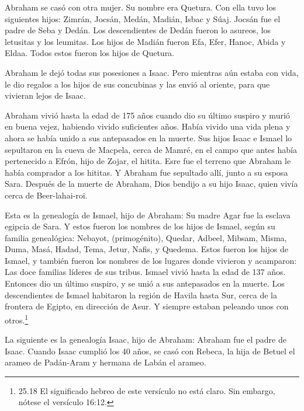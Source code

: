  Abraham se casó con otra mujer. Su nombre era Quetura.
 Con ella tuvo los siguientes hijos: Zimrán, Jocsán, Medán,
Madián, Isbac y Súaj.  Jocsán fue el padre de Seba y Dedán.
Los descendientes de Dedán fueron lo asureos, los letusitas y los
leumitas.  Los hijos de Madián fueron Efa, Efer, Hanoc,
Abida y Eldaa. Todos estos fueron los hijos de Quetura.

 Abraham le dejó todas sus posesiones a Isaac. 
Pero mientras aún estaba con vida, le dio regalos a los hijos de sus
concubinas y las envió al oriente, para que vivieran lejos de Isaac.

 Abraham vivió hasta la edad de 175 años  cuando
dio su último suspiro y murió en buena vejez, habiendo vivido
suficientes años. Había vivido una vida plena y ahora se había unido a
sus antepasados en la muerte.  Sus hijos Isaac e Ismael lo
sepultaron en la cueva de Macpela, cerca de Mamré, en el campo que antes
había pertenecido a Efrón, hijo de Zojar, el hitita.  Esre
fue el terreno que Abraham le había comprador a los hititas. Y Abraham
fue sepultado allí, junto a su esposa Sara.  Después de la
muerte de Abraham, Dios bendijo a su hijo Isaac, quien vivía cerca de
Beer-lahai-roi.

 Esta es la genealogía de Ismael, hijo de Abraham: Su madre
Agar fue la esclava egipcia de Sara.  Y estos fueron los
nombres de los hijos de Ismael, según su familia genealógica: Nebayot,
(primogénito), Quedar, Adbeel, Mibsam,  Misma, Duma, Masá,
 Hadad, Tema, Jetur, Nafis, y Quedema.  Estos
fueron los hijos de Ismael, y también fueron los nombres de los lugares
donde vivieron y acamparon: Las doce familias líderes de sus tribus.
 Ismael vivió hasta la edad de 137 años. Entonces dio un
último suspiro, y se unió a sus antepasados en la muerte. 
Los descendientes de Ismael habitaron la región de Havila hasta Sur,
cerca de la frontera de Egipto, en dirección de Asur. Y siempre estaban
peleando unos con otros.\footnote{25.18 El significado hebreo de este
  versículo no está claro. Sin embargo, nótese el versículo 16:12.}

 La siguiente es la genealogía Isaac, hijo de Abraham:
Abraham fue el padre de Isaac.  Cuando Isaac cumplió los 40
años, se casó con Rebeca, la hija de Betuel el arameo de Padán-Aram y
hermana de Labán el arameo.

